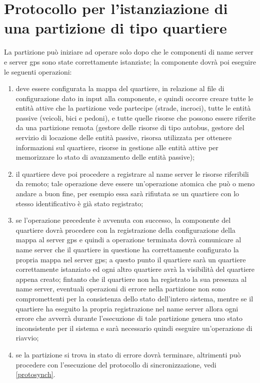 \section{Protocollo per l'istanziazione di una partizione di tipo quartiere}
La partizione può iniziare ad operare solo dopo che le componenti di name server e server gps sono state correttamente istanziate; la componente dovrà poi eseguire le seguenti operazioni:
\begin{enumerate}
\item deve essere configurata la mappa del quartiere, in relazione al file di configurazione dato in input alla componente, e quindi occorre creare tutte le entità attive che la partizione vede partecipe (strade, incroci), tutte le entità passive (veicoli, bici e pedoni), e tutte quelle risorse che possono essere riferite da una partizione remota (gestore delle risorse di tipo autobus, gestore del servizio di locazione delle entità passive, risorsa utilizzata per ottenere informazioni sul quartiere, risorse in gestione alle entità attive per memorizzare lo stato di avanzamento delle entità passive);
\item il quartiere deve poi procedere a registrare al name server le risorse riferibili da remoto; tale operazione deve essere un'operazione atomica che può o meno andare a buon fine, per esempio essa sarà rifiutata se un quartiere con lo stesso identificativo è già stato registrato;
\item se l'operazione precedente è avvenuta con successo, la componente del quartiere dovrà procedere con la registrazione della configurazione della mappa al server gps e quindi a operazione terminata dovrà comunicare al name server che il quartiere in questione ha correttamente configurato la propria mappa nel server gps; a questo punto il quartiere sarà un quartiere correttamente istanziato ed ogni altro quartiere avrà la visibilità del quartiere appena creato; fintanto che il quartiere non ha registrato la sua presenza al name server, eventuali operazioni di errore nella partizione non sono compromettenti per la consistenza dello stato dell'intero sistema, mentre se il quartiere ha eseguito la propria registrazione nel name server allora ogni errore che avverrà durante l'esecuzione di tale partizione genera uno stato inconsistente per il sistema e sarà necessario quindi eseguire un'operazione di riavvio; 
\item se la partizione si trova in stato di errore dovrà terminare, altrimenti può procedere con l'esecuzione del protocollo di sincronizzazione, vedi \ref{protosynch}.
\end{enumerate}
